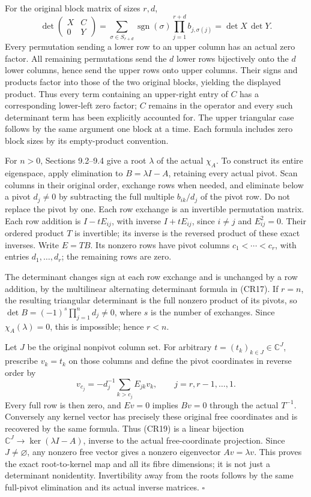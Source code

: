 \documentclass[
  11pt,
]{article}
\begin{document}
For the original block matrix of sizes \(r,d\), \[
 \det\begin{pmatrix}X&C\\0&Y\end{pmatrix}
  =\sum_{\sigma\in S_{r+d}}\operatorname{sgn}(\sigma)
       \prod_{j=1}^{r+d}b_{j,\sigma(j)}
  =\det X\,\det Y .                                           \tag{CR18b}
\] Every permutation sending a lower row to an upper column has an
actual zero factor. All remaining permutations send the \(d\) lower rows
bijectively onto the \(d\) lower columns, hence send the upper rows onto
upper columns. Their signs and products factor into those of the two
original blocks, yielding the displayed product. Thus every term
containing an upper-right entry of \(C\) has a corresponding lower-left
zero factor; \(C\) remains in the operator and every such determinant
term has been explicitly accounted for. The upper triangular case
follows by the same argument one block at a time. Each formula includes
zero block sizes by its empty-product convention.

For \(n>0\), Sections 9.2--9.4 give a root \(\lambda\) of the actual
\(\chi_A\). To construct its entire eigenspace, apply elimination to
\(B=\lambda I-A\), retaining every actual pivot. Scan columns in their
original order, exchange rows when needed, and eliminate below a pivot
\(d_j\ne0\) by subtracting the full multiple \(b_{ik}/d_j\) of the pivot
row. Do not replace the pivot by one. Each row exchange is an invertible
permutation matrix. Each row addition is \(I-tE_{ij}\), with inverse
\(I+tE_{ij}\), since \(i\ne j\) and \(E_{ij}^2=0\). Their ordered
product \(T\) is invertible; its inverse is the reversed product of
these exact inverses. Write \(E=TB\). Its nonzero rows have pivot
columns \(c_1<\cdots<c_r\), with entries \(d_1,\ldots,d_r\); the
remaining rows are zero.

The determinant changes sign at each row exchange and is unchanged by a
row addition, by the multilinear alternating determinant formula in
(CR17). If \(r=n\), the resulting triangular determinant is the full
nonzero product of its pivots, so
\(\det B=(-1)^s\prod_{j=1}^n d_j\ne0\), where \(s\) is the number of
exchanges. Since \(\chi_A(\lambda)=0\), this is impossible; hence
\(r<n\).

Let \(J\) be the original nonpivot column set. For arbitrary
\(t=(t_k)_{k\in J}\in\mathbb C^J\), prescribe \(v_k=t_k\) on those
columns and define the pivot coordinates in reverse order by \[
             v_{c_j}
                 =-d_j^{-1}\sum_{k>c_j}E_{jk}v_k,
                      \qquad j=r,r-1,\ldots,1.                \tag{CR19}
\] Every full row is then zero, and \(Ev=0\) implies \(Bv=0\) through
the actual \(T^{-1}\). Conversely any kernel vector has precisely these
original free coordinates and is recovered by the same formula. Thus
(CR19) is a linear bijection \(\mathbb C^J\to\ker(\lambda I-A)\),
inverse to the actual free-coordinate projection. Since
\(J\ne\varnothing\), any nonzero free vector gives a nonzero eigenvector
\(Av=\lambda v\). This proves the exact root-to-kernel map and all its
fibre dimensions; it is not just a determinant nonidentity.
Invertibility away from the roots follows by the same full-pivot
elimination and its actual inverse matrices. \(\square\)
\end{document}

